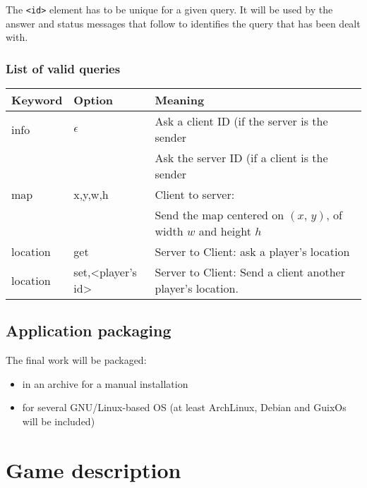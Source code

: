 \documentclass{article}
\begin{document}
The \texttt{<id>} element has to be unique for a given query. It will be used
by the answer and status messages that follow to identifies the query that has
been dealt with.

\subsubsection{List of valid queries}
\begin{tabular}{|l|l|l|}
	\hline
	\textbf{Keyword}&\textbf{Option}&Meaning\\\hline
	info&\(\epsilon\)&Ask a client ID (if the server is the sender\\
		 &&Ask the server ID (if a client is the sender\\\hline
	map&x,y,w,h&Client to server:\\
		&& Send the map centered on \((x,\,y)\), of width \(w\) and height
		\(h\)\\\hline
	location & get & Server to Client: ask a player's location\\\hline
	location & set,<player's id> & Server to Client: Send a client another
		player's location.\\\hline
\end{tabular}

\subsection{Application packaging}

The final work will be packaged:
\begin{itemize}
	\item in an archive for a manual installation
	\item for several GNU/Linux-based OS
	(at least ArchLinux, Debian and GuixOs will be included)
\end{itemize}



\section{Game description}
\end{document}
